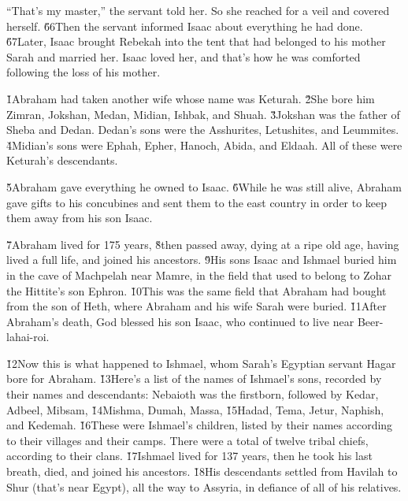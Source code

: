 ``That's my master,'' the servant told her. So she reached for a veil and covered herself. \v{66}Then the servant informed Isaac about everything he had done. \v{67}Later, Isaac brought Rebekah into the tent that had belonged to his mother Sarah and married her. Isaac loved her, and that's how he was comforted following the loss of his mother.

\v{1}Abraham had taken another wife whose name was Keturah. \v{2}She bore him Zimran, Jokshan, Medan, Midian, Ishbak, and Shuah. \v{3}Jokshan was the father of Sheba and Dedan. Dedan's sons were the Asshurites, Letushites, and Leummites. \v{4}Midian's sons were Ephah, Epher, Hanoch, Abida, and Eldaah. All of these were Keturah's descendants.

\v{5}Abraham gave everything he owned to Isaac. \v{6}While he was still alive, Abraham gave gifts to his concubines and sent them to the east country in order to keep them away from his son Isaac.

\v{7}Abraham lived for 175 years, \v{8}then passed away, dying at a ripe old age, having lived a full life, and joined his ancestors. \v{9}His sons Isaac and Ishmael buried him in the cave of Machpelah near Mamre, in the field that used to belong to Zohar the Hittite's son Ephron. \v{10}This was the same field that Abraham had bought from the son of Heth, where Abraham and his wife Sarah were buried. \v{11}After Abraham's death, God blessed his son Isaac, who continued to live near Beer-lahai-roi.

\v{12}Now this is what happened to Ishmael, whom Sarah's Egyptian servant Hagar bore for Abraham. \v{13}Here's a list of the names of Ishmael's sons, recorded by their names and descendants: Nebaioth was the firstborn, followed by Kedar, Adbeel, Mibsam, \v{14}Mishma, Dumah, Massa, \v{15}Hadad, Tema, Jetur, Naphish, and Kedemah. \v{16}These were Ishmael's children, listed by their names according to their villages and their camps. There were a total of twelve tribal chiefs, according to their clans. \v{17}Ishmael lived for 137 years, then he took his last breath, died, and joined his ancestors. \v{18}His descendants settled from Havilah to Shur (that's near Egypt), all the way to Assyria, in defiance of all of his relatives.

